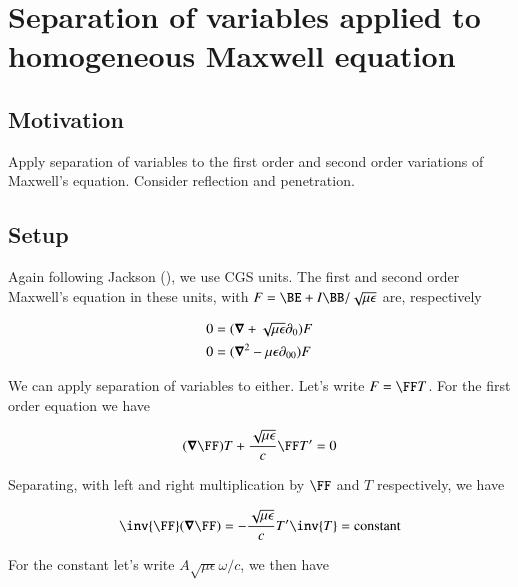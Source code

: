 %

\chapter{Separation of variables applied to homogeneous Maxwell equation}
\label{chap:maxwellSepVars}
{}
\date{Aug 9, 2009}

\beginArtWithToc

\section{Motivation}

Apply separation of variables to the first order and second order variations of Maxwell's equation.  Consider reflection and penetration.

\section{Setup}

Again following Jackson (\citep{jackson1975cew}), we use CGS units.  The first and second order Maxwell's equation in these units, with $F = \BE + I\BB/\sqrt{\mu\epsilon}$ are, respectively

\begin{align}\label{eqn:foo1}
0 &= (\boldsymbol{\nabla} + \sqrt{\mu\epsilon} \partial_0) F \\
0 &= (\boldsymbol{\nabla}^2 - {\mu\epsilon} \partial_{00}) F 
\end{align}

We can apply separation of variables to either.  Let's write $F = \FF T$.  For the first order equation we have

\begin{align*}
(\spacegrad \FF) T + \frac{\sqrt{\mu\epsilon}}{c} \FF T' = 0
\end{align*}

Separating, with left and right multiplication by $\FF$ and $T$ respectively, we have

\begin{align}\label{eqn:foo2}
\inv{\FF} (\spacegrad \FF) = -\frac{\sqrt{\mu\epsilon}}{c} T' \inv{T} = \text{constant}
\end{align}

For the constant let's write $A \sqrt{\mu\epsilon} \omega/c$, we then have

